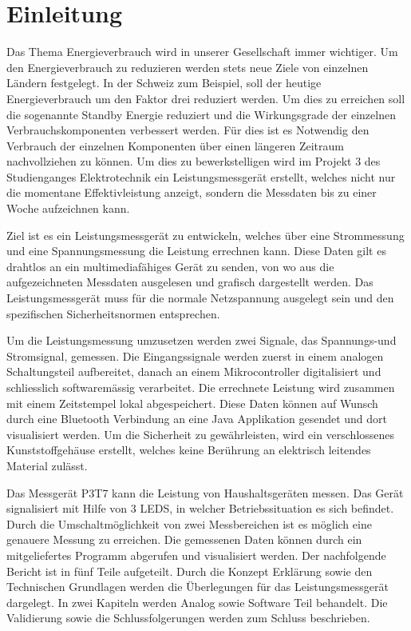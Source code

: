 \section{Einleitung}

Das Thema Energieverbrauch wird in unserer Gesellschaft immer wichtiger. Um den Energieverbrauch zu reduzieren werden stets neue Ziele von einzelnen Ländern festgelegt. In der Schweiz zum Beispiel, soll der heutige Energieverbrauch um den Faktor drei reduziert werden. Um dies zu erreichen soll die sogenannte Standby Energie reduziert und die Wirkungsgrade der einzelnen Verbrauchskomponenten verbessert werden. Für dies ist es Notwendig den Verbrauch der einzelnen Komponenten über einen längeren Zeitraum nachvollziehen zu können. Um dies zu bewerkstelligen wird im Projekt 3 des Studienganges Elektrotechnik ein Leistungsmessgerät erstellt, welches nicht nur die momentane Effektivleistung anzeigt, sondern die Messdaten bis zu einer Woche aufzeichnen kann. 

Ziel ist es ein Leistungsmessgerät zu entwickeln, welches über eine Strommessung und eine Spannungsmessung die Leistung errechnen kann. Diese Daten gilt es drahtlos an ein multimediafähiges Gerät zu senden, von wo aus die aufgezeichneten Messdaten ausgelesen und grafisch dargestellt werden. Das Leistungsmessgerät muss für die normale Netzspannung ausgelegt sein und den spezifischen Sicherheitsnormen entsprechen.

Um die Leistungsmessung umzusetzen werden zwei Signale, das Spannungs-und Stromsignal, gemessen. Die Eingangssignale werden zuerst in einem analogen Schaltungsteil aufbereitet, danach an einem Mikrocontroller digitalisiert und schliesslich softwaremässig verarbeitet. Die errechnete Leistung wird zusammen mit einem Zeitstempel lokal abgespeichert. Diese Daten können auf Wunsch durch eine Bluetooth Verbindung an eine Java Applikation gesendet und dort visualisiert werden. Um die Sicherheit zu gewährleisten, wird ein verschlossenes Kunststoffgehäuse erstellt, welches keine Berührung an elektrisch leitendes Material zulässt.

Das Messgerät P3T7 kann die Leistung von Haushaltsgeräten messen. Das Gerät signalisiert mit Hilfe von 3 LEDS, in welcher Betriebssituation es sich befindet. Durch die Umschaltmöglichkeit von zwei Messbereichen ist es möglich eine genauere Messung zu erreichen. Die gemessenen Daten können durch ein mitgeliefertes Programm abgerufen und visualisiert werden. 
Der nachfolgende Bericht ist in fünf Teile aufgeteilt. Durch die Konzept Erklärung sowie den Technischen Grundlagen werden die Überlegungen für das Leistungsmessgerät dargelegt. In zwei Kapiteln werden Analog sowie Software Teil behandelt. Die Validierung sowie die Schlussfolgerungen werden zum Schluss beschrieben. 


\pagebreak